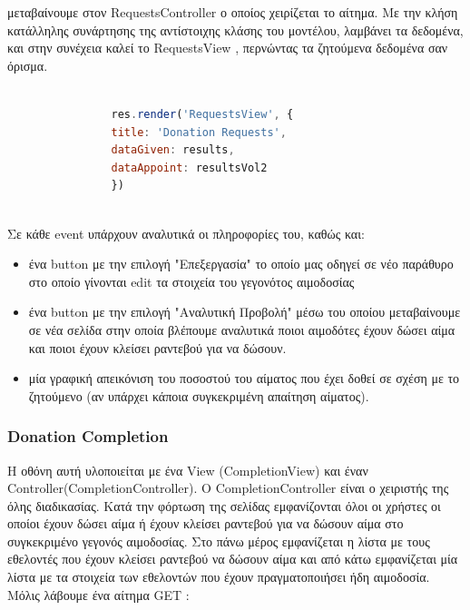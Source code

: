 μεταβαίνουμε στον RequestsController ο οποίος χειρίζεται το αίτημα. Με την κλήση κατάλληλης συνάρτησης της αντίστοιχης κλάσης του μοντέλου, λαμβάνει τα δεδομένα,  και στην συνέχεια καλεί το RequestsView , περνώντας τα ζητούμενα δεδομένα σαν όρισμα.



		\begin{lstlisting}[language=Javascript]			
		
	            res.render('RequestsView', { 
                title: 'Donation Requests',
                dataGiven: results,
                dataAppoint: resultsVol2
                })
                
		\end{lstlisting}
		
		Σε κάθε event υπάρχουν αναλυτικά οι πληροφορίες του, καθώς και:
		
		\begin{itemize}
		\item ένα button με την επιλογή "Επεξεργασία" το οποίο μας οδηγεί σε νέο παράθυρο στο οποίο γίνονται edit τα στοιχεία του γεγονότος αιμοδοσίας
		
		\item ένα button με την επιλογή "Αναλυτική Προβολή" μέσω του οποίου μεταβαίνουμε σε νέα σελίδα στην οποία βλέπουμε αναλυτικά ποιοι αιμοδότες έχουν δώσει αίμα και ποιοι έχουν κλείσει ραντεβού για να δώσουν.
		
		\item μία γραφική απεικόνιση του ποσοστού του αίματος που έχει δοθεί σε σχέση με το ζητούμενο (αν υπάρχει κάποια συγκεκριμένη απαίτηση αίματος).
		
		\end{itemize}


	
	
				\subsubsection{Donation Completion}
		
	Η οθόνη αυτή υλοποιείται με ένα View (CompletionView) και έναν Controller(CompletionController). O CompletionController είναι ο χειριστής της όλης διαδικασίας. Κατά την φόρτωση της σελίδας εμφανίζονται όλοι οι χρήστες οι οποίοι έχουν δώσει αίμα ή έχουν κλείσει ραντεβού για να δώσουν αίμα στο συγκεκριμένο γεγονός αιμοδοσίας. Στο πάνω μέρος εμφανίζεται η λίστα με τους εθελοντές που έχουν κλείσει ραντεβού να δώσουν αίμα και από κάτω εμφανίζεται μία λίστα με τα στοιχεία των εθελοντών που έχουν πραγματοποιήσει ήδη αιμοδοσία. Μόλις λάβουμε ένα αίτημα GET :
		
